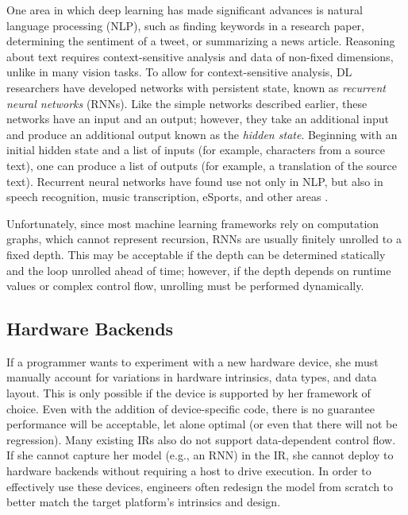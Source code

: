 One area in which deep learning has made significant advances is
  natural language processing (NLP), such as finding keywords in a
  research paper, determining the sentiment of a tweet,
  or summarizing a news article.
Reasoning about text requires context-sensitive analysis and data of
  non-fixed dimensions, unlike in many vision tasks.
To allow for context-sensitive analysis, DL researchers have developed networks with persistent
state, known as \textit{recurrent neural networks}  (RNNs). Like the simple networks described
earlier, these networks have an input and an output; however, they take an additional input and
produce an additional output known as the \textit{hidden state}. Beginning with an initial hidden
state and a list of inputs (for example, characters from a source text), one can produce a
list of outputs (for example, a translation of the source text). %
Recurrent neural networks have found use not only in NLP, but also in speech recognition, music
transcription, eSports, and other areas \citep{lstm, speech_recognition, OpenAI_dota}.

Unfortunately, since most machine learning frameworks rely on computation graphs,
  which cannot represent recursion, RNNs are usually finitely unrolled to a fixed depth.
This may be acceptable if the depth can be determined statically and the loop unrolled
  ahead of time; however, if the depth depends on runtime values or complex control flow,
  unrolling must be performed dynamically.

\subsection{Hardware Backends}

If a programmer wants to experiment with a new hardware device,
  she must manually account for variations in hardware intrinsics, data
  types, and data layout.
This is only possible if the device is supported by her framework of choice.
Even with the addition of device-specific code,
  there is no guarantee performance will be acceptable, let alone optimal
  (or even that there will not be regression).
Many existing IRs also do not support data-dependent control flow.
If she cannot capture her model (e.g., an RNN) in the IR,
  she cannot deploy to hardware backends without requiring a host to drive
  execution.
In order to effectively use these devices,
  engineers often redesign the model from scratch to better match the target
  platform's intrinsics and design.

